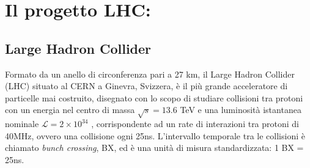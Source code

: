\chapter{Il progetto LHC:}

\sloppy
\section{Large Hadron Collider}
\label{sec:LHC}
Formato da un anello di circonferenza pari a 27 km, il Large Hadron Collider (LHC) situato al CERN a Ginevra, Svizzera, è il più grande acceleratore di particelle mai costruito, disegnato con lo scopo di studiare collisioni tra protoni con un energia nel centro di massa $\sqrt{s} = 13.6$ TeV e una luminosità istantanea nominale $\mathcal{L} = 2 \times 10^{34}$ \Lumi, corrispondente ad un rate di interazioni tra protoni di 40MHz, ovvero una collisione ogni 25ns. L'intervallo temporale tra le collisioni è chiamato \textit{bunch crossing}, BX, ed è una unità di misura standardizzata: 1 BX = 25ns.


